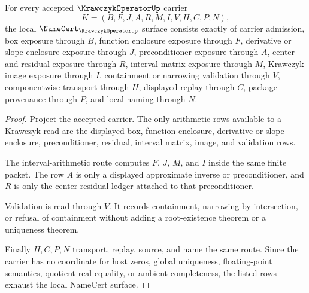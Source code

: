 \begin{theorem}
\label{thm:krawczyk-operator-namecert-obligations}
For every accepted $\KrawczykOperatorUp$ carrier
$$
K=(B,F,J,A,R,M,I,V,H,C,P,N),
$$
the local $\NameCert_{\KrawczykOperatorUp}$ surface consists exactly of carrier admission, box exposure through $B$, function enclosure exposure through $F$, derivative or slope enclosure exposure through $J$, preconditioner exposure through $A$, center and residual exposure through $R$, interval matrix exposure through $M$, Krawczyk image exposure through $I$, containment or narrowing validation through $V$, componentwise transport through $H$, displayed replay through $C$, package provenance through $P$, and local naming through $N$.
\end{theorem}
\begin{proof}
Project the accepted carrier. The only arithmetic rows available to a Krawczyk read are the displayed box, function enclosure, derivative or slope enclosure, preconditioner, residual, interval matrix, image, and validation rows.

The interval-arithmetic route computes $F$, $J$, $M$, and $I$ inside the same finite packet. The row $A$ is only a displayed approximate inverse or preconditioner, and $R$ is only the center-residual ledger attached to that preconditioner.

Validation is read through $V$. It records containment, narrowing by intersection, or refusal of containment without adding a root-existence theorem or a uniqueness theorem.

Finally $H,C,P,N$ transport, replay, source, and name the same route. Since the carrier has no coordinate for host zeros, global uniqueness, floating-point semantics, quotient real equality, or ambient completeness, the listed rows exhaust the local NameCert surface.
\end{proof}

